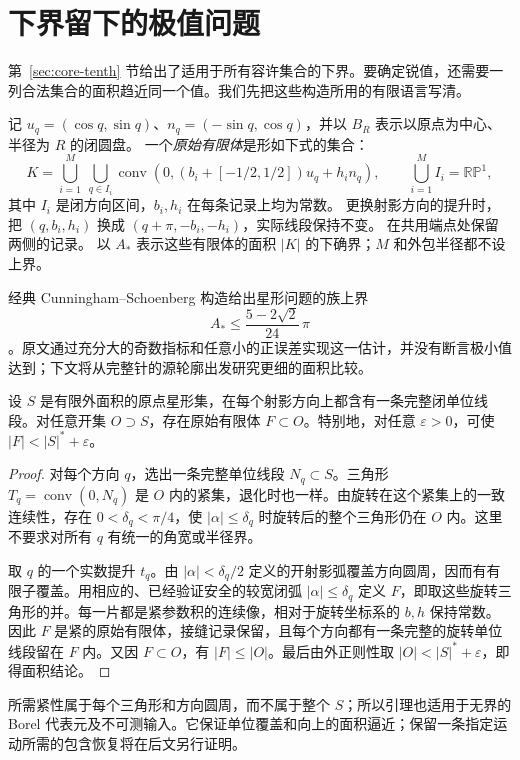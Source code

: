 \section{下界留下的极值问题}\label{sec:extremal}
第~\ref{sec:core-tenth} 节给出了适用于所有容许集合的下界。要确定锐值，还需要一列合法集合的面积趋近同一个值。我们先把这些构造所用的有限语言写清。

记 $u_q=(\cos q,\sin q)$、$n_q=(-\sin q,\cos q)$，并以 $B_R$ 表示以原点为中心、半径为 $R$ 的闭圆盘。
一个\emph{原始有限体}是形如下式的集合：
\begin{equation}\label{eq:upper-original}
 K=\bigcup_{i=1}^{M}\ \bigcup_{q\in I_i}
 \operatorname{conv}\left(0,
 (b_i+[-1/2,1/2])u_q+h_i n_q\right),
 \qquad \bigcup_{i=1}^{M}I_i=\mathbb {RP}^1,
\end{equation}
其中 $I_i$ 是闭方向区间，$b_i,h_i$ 在每条记录上均为常数。
更换射影方向的提升时，把 $(q,b_i,h_i)$ 换成 $(q+\pi,-b_i,-h_i)$，实际线段保持不变。
在共用端点处保留两侧的记录。
以 $A_*$ 表示这些有限体的面积 $|K|$ 的下确界；$M$ 和外包半径都不设上界。


经典 Cunningham--Schoenberg 构造给出星形问题的族上界
\[
 A_*\le \frac{5-2\sqrt2}{24}\,\pi
\]
\cite{CunninghamSchoenberg1965}。原文通过充分大的奇数指标和任意小的正误差实现这一估计，并没有断言极小值达到；下文将从完整针的源轮廓出发研究更细的面积比较。

\begin{lemma}[开包络中的有限恢复]\label{lem:finite-open-recovery}
设 $S$ 是有限外面积的原点星形集，在每个射影方向上都含有一条完整闭单位线段。对任意开集 $O\supset S$，存在原始有限体 $F\subset O$。特别地，对任意 $\varepsilon>0$，可使 $|F|<|S|^*+\varepsilon$。
\end{lemma}
\begin{proof}
对每个方向 $q$，选出一条完整单位线段 $N_q\subset S$。三角形 $T_q=\operatorname{conv}(0,N_q)$ 是 $O$ 内的紧集，退化时也一样。由旋转在这个紧集上的一致连续性，存在 $0<\delta_q<\pi/4$，使 $|\alpha|\le\delta_q$ 时旋转后的整个三角形仍在 $O$ 内。这里不要求对所有 $q$ 有统一的角宽或半径界。

取 $q$ 的一个实数提升 $t_q$。由 $|\alpha|<\delta_q/2$ 定义的开射影弧覆盖方向圆周，因而有有限子覆盖。用相应的、已经验证安全的较宽闭弧 $|\alpha|\le\delta_q$ 定义 $F$，即取这些旋转三角形的并。每一片都是紧参数积的连续像，相对于旋转坐标系的 $b,h$ 保持常数。因此 $F$ 是紧的原始有限体，接缝记录保留，且每个方向都有一条完整的旋转单位线段留在 $F$ 内。又因 $F\subset O$，有 $|F|\le|O|$。最后由外正则性取 $|O|<|S|^*+\varepsilon$，即得面积结论。
\end{proof}
所需紧性属于每个三角形和方向圆周，而不属于整个 $S$；所以引理也适用于无界的 Borel 代表元及不可测输入。它保证单位覆盖和向上的面积逼近；保留一条指定运动所需的包含恢复将在后文另行证明。

